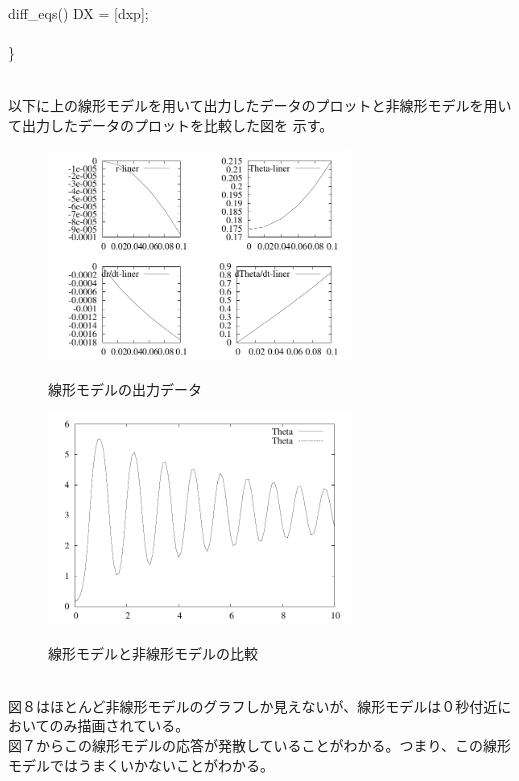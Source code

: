 \documentclass{jarticle}
\begin{document}
\begin{enumerate}
\begin{enumerate}
\begin{enumerate}
\begin{itembox}[l]{diff\_eqs()}
							DX = [dxp];\\
							\\
						\}\\
					\end{itembox}
					\\
					以下に上の線形モデルを用いて出力したデータのプロットと非線形モデルを用いて出力したデータのプロットを比較した図を
					示す。\\
					\begin{figure}[htbp]
					\begin{center}
						\includegraphics[width=8cm]{gazo/InPeAboveLiner.pdf}\\
					\end{center}
					\caption{線形モデルの出力データ}
					\end{figure}
					\begin{figure}[htbp]
					\begin{center}
						\includegraphics[width=8cm]{gazo/AboveLinerNonLinerComp.pdf}\\
					\end{center}
					\caption{線形モデルと非線形モデルの比較}
					\end{figure}
					\\
					図８はほとんど非線形モデルのグラフしか見えないが、線形モデルは０秒付近においてのみ描画されている。\\
					図７からこの線形モデルの応答が発散していることがわかる。つまり、この線形モデルではうまくいかないことがわかる。\\
				

\end{enumerate}
\end{enumerate}
\end{enumerate}
\end{document}
